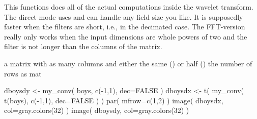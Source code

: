 \documentclass[a4paper]{book}
\begin{document}
%
\begin{Details}\relax
This functions does all of the actual computations inside the wavelet transform. The direct mode uses  and can handle any field size you like. It is supposedly faster when the filters are short, i.e., in the decimated case. The FFT-version really only works when the input dimensions are whole powers of two and the filter is not longer than the columns of the matrix.
\end{Details}
%
\begin{Value}
a matrix with as many columns and either the same () or half () the number of rows as mat
\end{Value}
%
\begin{Examples}
\begin{ExampleCode}
dboysdy <- my_conv( boys, c(-1,1), dec=FALSE )
dboysdx <- t( my_conv( t(boys), c(-1,1), dec=FALSE ) )
par( mfrow=c(1,2) )
image( dboysdx, col=gray.colors(32) )
image( dboysdy, col=gray.colors(32) )
\end{ExampleCode}
\end{Examples}
\printindex{}
\end{document}
